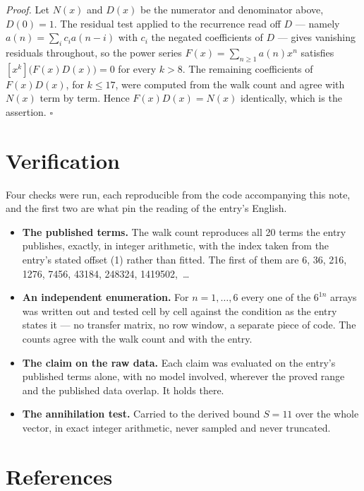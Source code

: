 \documentclass[11pt]{article}
\theoremstyle{definition}
\begin{document}
{\itshape Proof.} Let $N(x)$ and $D(x)$ be the numerator and denominator above, $D(0)=1$. The residual test applied to the recurrence read off $D$ --- namely $a(n) = \sum_i c_i a(n-i)$ with $c_i$ the negated coefficients of $D$ --- gives vanishing residuals throughout, so the power series $F(x)=\sum_{n\ge 1}a(n)x^n$ satisfies $[x^k]\bigl(F(x)D(x)\bigr) = 0$ for every $k > 8$. The remaining coefficients of $F(x)D(x)$, for $k \le 17$, were computed from the walk count and agree with $N(x)$ term by term. Hence $F(x)D(x) = N(x)$ identically, which is the assertion. $\square$

\section{Verification}

Four checks were run, each reproducible from the code accompanying this note, and the first two are what pin the reading of the entry's English.

\begin{itemize}

\item {\bfseries The published terms.} The walk count reproduces all 20 terms the entry publishes, exactly, in integer arithmetic, with the index taken from the entry's stated offset (1) rather than fitted. The first of them are 6, 36, 216, 1276, 7456, 43184, 248324, 1419502,~\dots

\item {\bfseries An independent enumeration.} For $n = 1,\dots,6$ every one of the $6^{1n}$ arrays was written out and tested cell by cell against the condition as the entry states it --- no transfer matrix, no row window, a separate piece of code. The counts agree with the walk count and with the entry.

\item {\bfseries The claim on the raw data.} Each claim was evaluated on the entry's published terms alone, with no model involved, wherever the proved range and the published data overlap. It holds there.

\item {\bfseries The annihilation test.} Carried to the derived bound $S = 11$ over the whole vector, in exact integer arithmetic, never sampled and never truncated.

\end{itemize}

\section{References}
\end{document}
